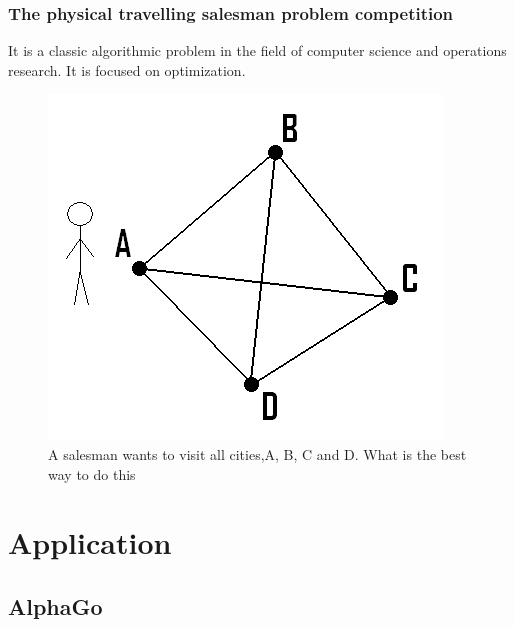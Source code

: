 \documentclass{beamer}
\begin{document}
\begin{frame}
  \frametitle{The physical travelling salesman problem competition\cite{4}}
  It is a classic algorithmic problem in the field of computer science and operations research. It is focused on optimization.
  \begin{figure}
    \includegraphics[width=0.6\linewidth]{figures/Salesman}
    \caption{A salesman wants to visit all cities,A, B, C and D. What is the best way to do this}
  \end{figure}
\end{frame}

\section{Application}
\subsection{AlphaGo}

\end{document}
